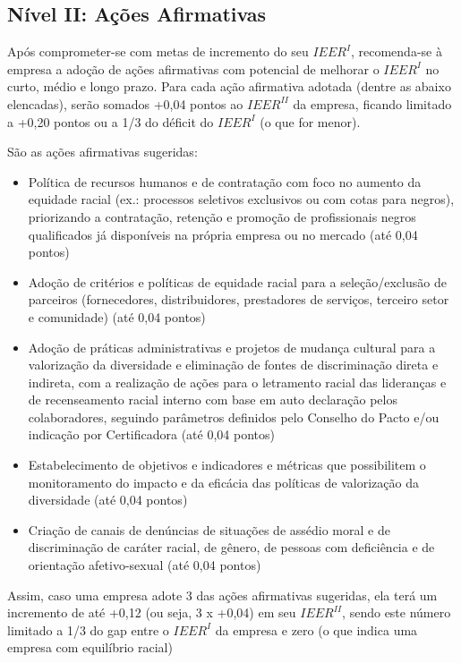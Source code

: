 \documentclass[12pt]{article}
\begin{document}
\subsection{Nível II: Ações Afirmativas} \label{levels2}

\par Após comprometer-se com metas de incremento do seu $IEER^{I}$, recomenda-se à empresa a
adoção de ações afirmativas com potencial de melhorar o $IEER^{I}$ no curto, médio e longo prazo. Para cada ação afirmativa adotada (dentre as abaixo elencadas), serão somados +0,04 pontos ao $IEER^{II}$ da empresa, ficando limitado a +0,20 pontos ou a 1/3 do déficit do $IEER^{I}$ (o que for menor).

\par São as ações afirmativas sugeridas:
\begin{itemize}
    \item Política de recursos humanos e de contratação com foco no aumento da equidade racial (ex.:
    processos seletivos exclusivos ou com cotas para negros), priorizando a contratação,
    retenção e promoção de profissionais negros qualificados já disponíveis na própria empresa
    ou no mercado (até 0,04 pontos)
    \item Adoção de critérios e políticas de equidade racial para a seleção/exclusão de parceiros
    (fornecedores, distribuidores, prestadores de serviços, terceiro setor e comunidade) (até
    0,04 pontos)
    \item Adoção de práticas administrativas e projetos de mudança cultural para a valorização da
    diversidade e eliminação de fontes de discriminação direta e indireta, com a realização de
    ações para o letramento racial das lideranças e de recenseamento racial interno com base
    em auto declaração pelos colaboradores, seguindo parâmetros definidos pelo Conselho do
    Pacto e/ou indicação por Certificadora (até 0,04 pontos)
    \item Estabelecimento de objetivos e indicadores e métricas que possibilitem o monitoramento do
    impacto e da eficácia das políticas de valorização da diversidade (até 0,04 pontos)
    \item Criação de canais de denúncias de situações de assédio moral e de discriminação de caráter
    racial, de gênero, de pessoas com deficiência e de orientação afetivo-sexual (até 0,04
    pontos)
\end{itemize}



\par Assim, caso uma empresa adote 3 das ações afirmativas sugeridas, ela terá um incremento de até +0,12
(ou seja, 3 x +0,04) em seu $IEER^{II}$, sendo este número limitado a 1/3 do gap entre o $IEER^{I}$ da
empresa e zero (o que indica uma empresa com equilíbrio racial)
\end{document}
